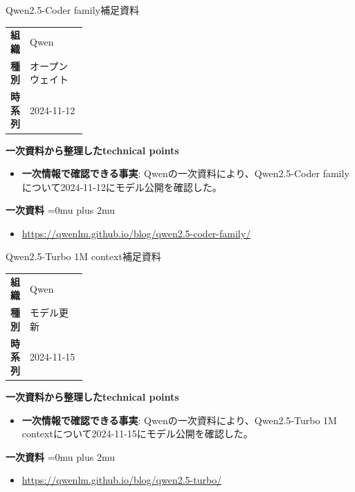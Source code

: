 \begin{technicalnote}{Qwen2.5-Coder family}{補足資料}
\begingroup
\begin{tabularx}{\linewidth}{@{}>{\bfseries}p{0.22\linewidth}X@{}}
組織 & Qwen \\
種別 & オープンウェイト \\
時系列 & 2024-11-12 \\
\end{tabularx}
\smallskip
{\bfseries 一次資料から整理したtechnical points}
\begin{itemize}[leftmargin=1.5em,itemsep=0.35em]
\item \textbf{一次情報で確認できる事実}: Qwenの一次資料により、Qwen2.5-Coder familyについて2024-11-12にモデル公開を確認した。
\end{itemize}
\begin{minipage}{\linewidth}
\begin{samepage}
{\bfseries 一次資料}
\begingroup\sloppy
\Urlmuskip=0mu plus 2mu\relax
\begin{itemize}[leftmargin=1.5em,itemsep=0.25em]
\item {\scriptsize\url{https://qwenlm.github.io/blog/qwen2.5-coder-family/}}
\end{itemize}
\endgroup
\end{samepage}
\end{minipage}
\endgroup
\end{technicalnote}
\medskip

\begin{technicalnote}{Qwen2.5-Turbo 1M context}{補足資料}
\begingroup
\begin{tabularx}{\linewidth}{@{}>{\bfseries}p{0.22\linewidth}X@{}}
組織 & Qwen \\
種別 & モデル更新 \\
時系列 & 2024-11-15 \\
\end{tabularx}
\smallskip
{\bfseries 一次資料から整理したtechnical points}
\begin{itemize}[leftmargin=1.5em,itemsep=0.35em]
\item \textbf{一次情報で確認できる事実}: Qwenの一次資料により、Qwen2.5-Turbo 1M contextについて2024-11-15にモデル公開を確認した。
\end{itemize}
\begin{minipage}{\linewidth}
\begin{samepage}
{\bfseries 一次資料}
\begingroup\sloppy
\Urlmuskip=0mu plus 2mu\relax
\begin{itemize}[leftmargin=1.5em,itemsep=0.25em]
\item {\scriptsize\url{https://qwenlm.github.io/blog/qwen2.5-turbo/}}
\end{itemize}
\endgroup
\end{samepage}
\end{minipage}
\endgroup
\end{technicalnote}
\medskip

